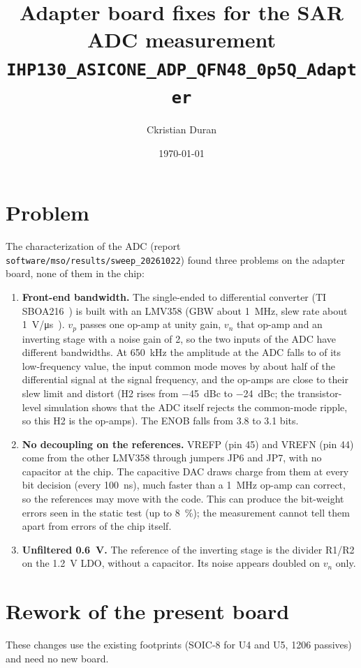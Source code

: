 \documentclass[10pt,a4paper]{article}
\title{Adapter board fixes for the SAR ADC measurement\\
\large \texttt{IHP130\_ASICONE\_ADP\_QFN48\_0p5Q\_Adapter}}
\author{Ckristian Duran}
\date{\today}
\begin{document}
\maketitle

\section{Problem}
The characterization of the ADC (report \texttt{software/mso/results/sweep\_20261022}) found three
problems on the adapter board, none of them in the chip:
\begin{enumerate}
  \item \textbf{Front-end bandwidth.} The single-ended to differential converter (TI
        SBOA216~\cite{sboa216}) is built with an LMV358 (GBW about \SI{1}{MHz}, slew rate about
        \SI{1}{V/\micro s}~\cite{lmv358}). $v_p$ passes one op-amp at unity gain, $v_n$ that op-amp
        and an inverting stage with a noise gain of 2, so the two inputs of the ADC have different
        bandwidths. At \SI{650}{kHz} the amplitude at the ADC falls to \MeasGainHigh{} of its
        low-frequency value, the input common mode moves by about half of the differential signal
        at the signal frequency, and the op-amps are close to their slew limit and distort (H2 rises
        from \SI{-45}{dBc} to \SI{-24}{dBc}; the transistor-level simulation shows that the ADC itself
        rejects the common-mode ripple, so this H2 is the op-amps). The ENOB falls from 3.8 to
        3.1 bits.
  \item \textbf{No decoupling on the references.} VREFP (pin 45) and VREFN (pin 44) come from the
        other LMV358 through jumpers JP6 and JP7, with no capacitor at the chip. The capacitive DAC
        draws charge from them at every bit decision (every \SI{100}{ns}), much faster than a
        \SI{1}{MHz} op-amp can correct, so the references may move with the code. This can produce
        the bit-weight errors seen in the static test (up to \SI{8}{\percent}); the measurement
        cannot tell them apart from errors of the chip itself.
  \item \textbf{Unfiltered \SI{0.6}{V}.} The reference of the inverting stage is the divider R1/R2
        on the \SI{1.2}{V} LDO, without a capacitor. Its noise appears doubled on $v_n$ only.
\end{enumerate}

\section{Rework of the present board}
These changes use the existing footprints (SOIC-8 for U4 and U5, 1206 passives) and need no new
board.
\end{document}
